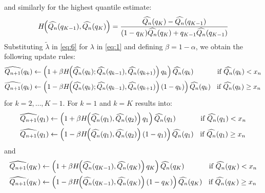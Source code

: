 \documentclass[10pt, a4paper]{article}
\newtheorem{rational for conjecture}{Rational for Conjecture}
\begin{document}
and similarly for the highest quantile estimate:
\begin{align*}
  H\hspace{-1mm}\left(\widehat{Q_{n}}(q_{K-1}), \widehat{Q_{n}}(q_{K}) \right) = \frac{\widehat{Q_{n}}(q_{K}) - \widehat{Q_{n}}(q_{K-1})}{(1-q_{K})\widehat{Q_{n}}(q_{K}) + q_{K-1} \widehat{Q_{n}}(q_{K-1})}
\end{align*}
Substituting $\widetilde{\lambda}$ in \eqref{eq:6} for $\lambda$ in \eqref{eq:1} and defining $\beta = 1 - \alpha$, we obtain the following update rules:
\begin{align}
\label{eq:7}
  \begin{split}
   \widehat{Q_{n+1}}(q_k) &\leftarrow \left(1 + \beta H\hspace{-1mm}\left(\widehat{Q_{n}}(q_{k}); \widehat{Q_{n}}(q_{k-1}), \widehat{Q_{n}}(q_{k+1}) \right) q_k\right) \widehat{Q_{n}}(q_k) \hspace{11mm}\text{ if } \widehat{Q_{n}}(q_k) < x_n \\
   \widehat{Q_{n+1}}(q_k) &\leftarrow \left(1 - \beta H\hspace{-1mm}\left(\widehat{Q_{n}}(q_{k}); \widehat{Q_{n}}(q_{k-1}), \widehat{Q_{n}}(q_{k+1}) \right) (1-q_k)\right) \widehat{Q_{n}}(q_k)\hspace{2mm}\text{ if } \widehat{Q_{n}}(q_k) \geq x_n
  \end{split}
\end{align}
for $k = 2, \ldots, K-1$. For $k=1$ and $k=K$ results into:
\begin{align}
\label{eq:8_2}
  \begin{split}
   \widehat{Q_{n+1}}(q_1) &\leftarrow \left(1 + \beta H\hspace{-1mm}\left(\widehat{Q_{n}}(q_{1}), \widehat{Q_{n}}(q_{2}) \right) q_1\right) \widehat{Q_{n}}(q_1) \hspace{11mm}\text{ if } \widehat{Q_{n}}(q_1) < x_n \\
   \widehat{Q_{n+1}}(q_1) &\leftarrow \left(1 - \beta H\hspace{-1mm}\left(\widehat{Q_{n}}(q_{1}), \widehat{Q_{n}}(q_{2}) \right) (1-q_1)\right) \widehat{Q_{n}}(q_1)\hspace{2mm}\text{ if } \widehat{Q_{n}}(q_1) \geq x_n
  \end{split}
\end{align}
and
\begin{align}
\label{eq:9}
  \begin{split}
   \widehat{Q_{n+1}}(q_K) &\leftarrow \left(1 + \beta H\hspace{-1mm}\left(\widehat{Q_{n}}(q_{K-1}), \widehat{Q_{n}}(q_{K}) \right) q_K\right) \widehat{Q_{n}}(q_K) \hspace{11mm}\text{ if } \widehat{Q_{n}}(q_K) < x_n \\
   \widehat{Q_{n+1}}(q_K) &\leftarrow \left(1 - \beta H\hspace{-1mm}\left(\widehat{Q_{n}}(q_{K-1}), \widehat{Q_{n}}(q_{K}) \right) (1-q_K)\right) \widehat{Q_{n}}(q_K)\hspace{2mm}\text{ if } \widehat{Q_{n}}(q_K) \geq x_n
  \end{split}
\end{align}
\end{document}

